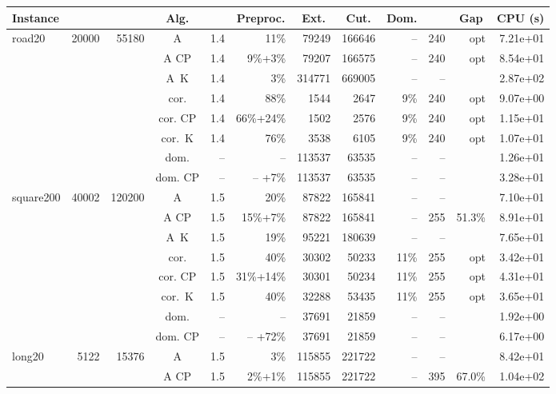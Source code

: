\documentclass[11pt]{amsart}
\newenvironment{outdent}
{\begin{list}{}{\leftmargin-2cm\rightmargin\leftmargin}\centering\item\relax}
{\end{list}\ignorespacesafterend}
\theoremstyle{plain}
\theoremstyle{remark}
\begin{document}
\begin{table}
\begin{outdent}
\begin{small}
\begin{tabular}{|l|rrc|rr|rrr|rr|r|}
\hline
Instance 
& \multicolumn{1}{c}{} 
& \multicolumn{1}{c}{} 
& \multicolumn{1}{c|}{Alg.} 
& \multicolumn{1}{c}{} 
& \multicolumn{1}{c|}{Preproc.} 
& \multicolumn{1}{c}{Ext.} 
& \multicolumn{1}{c}{Cut.} 
& \multicolumn{1}{c|}{Dom.} 
& \multicolumn{1}{c}{} 
& \multicolumn{1}{c|}{Gap} 
& \multicolumn{1}{c|}{CPU (s)} \\
\hline
road20 & 20000 & 55180 & A & 1.4 & 11\% &79249 & 166646 & -- &240 & opt & 7.21e+01 \\
&&&A CP & 1.4 & 9\%+3\% &79207 & 166575 & -- &240 & opt & 8.54e+01 \\
&&&A~K & 1.4 & 3\% &314771 & 669005 & -- & -- & & 2.87e+02 \\
&&&cor. & 1.4 & 88\% &1544 & 2647 & 9\% &240 & opt & 9.07e+00 \\
&&&cor. CP & 1.4 & 66\%+24\% &1502 & 2576 & 9\% &240 & opt & 1.15e+01 \\
&&&cor.~K & 1.4 & 76\% &3538 & 6105 & 9\% &240 & opt & 1.07e+01 \\
&&&dom. & -- & --  &113537 & 63535 & -- & -- & & 1.26e+01 \\
&&&dom. CP & -- & -- +7\% &113537 & 63535 & -- & -- & & 3.28e+01 \\
\hline
square200 & 40002 & 120200 & A & 1.5 & 20\% &87822 & 165841 & -- & -- & & 7.10e+01 \\
&&&A CP & 1.5 & 15\%+7\% &87822 & 165841 & -- &255 & 51.3\% & 8.91e+01 \\
&&&A~K & 1.5 & 19\% &95221 & 180639 & -- & -- & & 7.65e+01 \\
&&&cor. & 1.5 & 40\% &30302 & 50233 & 11\% &255 & opt & 3.42e+01 \\
&&&cor. CP & 1.5 & 31\%+14\% &30301 & 50234 & 11\% &255 & opt & 4.31e+01 \\
&&&cor.~K & 1.5 & 40\% &32288 & 53435 & 11\% &255 & opt & 3.65e+01 \\
&&&dom. & -- & --  &37691 & 21859 & -- & -- & & 1.92e+00 \\
&&&dom. CP & -- & -- +72\% &37691 & 21859 & -- & -- & & 6.17e+00 \\
\hline
long20 & 5122 & 15376 & A & 1.5 & 3\% &115855 & 221722 & -- & -- & & 8.42e+01 \\
&&&A CP & 1.5 & 2\%+1\% &115855 & 221722 & -- &395 & 67.0\% & 1.04e+02 \\

\end{tabular}
\end{small}
\end{outdent}
\end{table}
\end{document}
